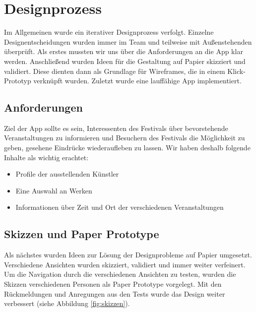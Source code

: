 \section{Designprozess}
Im Allgemeinen wurde ein iterativer Designprozess verfolgt. Einzelne Designentscheidungen wurden immer im Team und teilweise mit Außenstehenden überprüft. Als erstes mussten wir uns über die Anforderungen an die App klar werden. Anschließend wurden Ideen für die Gestaltung auf Papier skizziert und validiert. Diese dienten dann als Grundlage für Wireframes, die in einem Klick-Prototyp verknüpft wurden. Zuletzt wurde eine lauffähige App implementiert. 
\subsection{Anforderungen}
Ziel der App sollte es sein, Interessenten des Festivals über bevorstehende Veranstaltungen zu informieren und Besuchern des Festivals die Möglichkeit zu geben, gesehene Eindrücke wiederaufleben zu lassen. Wir haben deshalb folgende Inhalte als wichtig erachtet:
\begin{itemize}
\itemsep0.5pt
\item Profile der ausstellenden Künstler
\item Eine Auswahl an Werken
\item Informationen über Zeit und Ort der verschiedenen Veranstaltungen
\end{itemize}
\subsection{Skizzen und Paper Prototype}
Als nächstes wurden Ideen zur Lösung der Designprobleme auf Papier umgesetzt. Verschiedene Ansichten wurden skizziert, validiert und immer weiter verfeinert. Um die Navigation durch die verschiedenen Ansichten zu testen, wurden die Skizzen verschiedenen Personen als Paper Prototype vorgelegt. Mit den Rückmeldungen und Anregungen aus den Tests wurde das Design weiter verbessert (siehe Abbildung \ref{fig:skizzen}).


